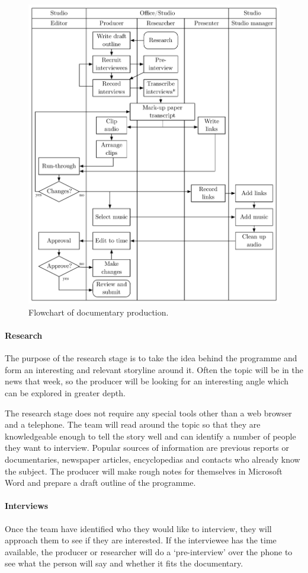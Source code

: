 \begin{figure}[ht]
  \centering
  \includegraphics[width=4.5in]{figs/docs-workflow.pdf}
  \caption{Flowchart of documentary production.}
  \label{fig:ethno-drama-recording}
\end{figure}

\paragraph{Research}
The purpose of the research stage is to take the idea behind the programme and form an interesting and relevant
storyline around it. Often the topic will be in the news that week, so the producer will be looking for an interesting
angle which can be explored in greater depth.

The research stage does not require any special tools other than a web browser and a telephone. The team will read
around the topic so that they are knowledgeable enough to tell the story well and can identify a number of people they
want to interview. Popular sources of information are previous reports or documentaries, newspaper articles,
encyclopedias and contacts who already know the subject. The producer will make rough notes for themselves in Microsoft
Word and prepare a draft outline of the programme.

\paragraph{Interviews}
Once the team have identified who they would like to interview, they will approach them to see if they are interested.
If the interviewee has the time available, the producer or researcher will do a `pre-interview' over the phone to see
what the person will say and whether it fits the documentary.

